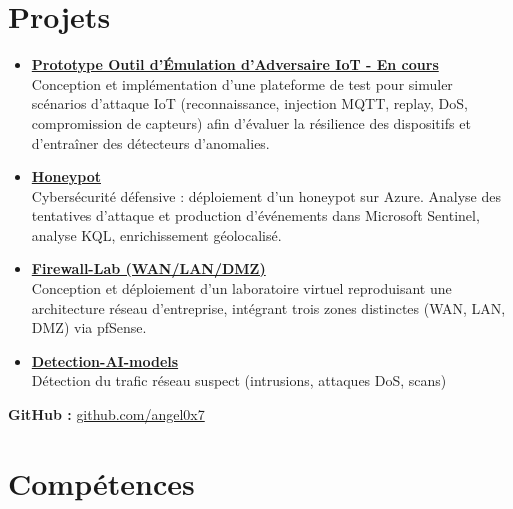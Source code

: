 \documentclass[a4paper,10pt]{article}
\begin{document}
\section*{Projets}


\begin{itemize}[leftmargin=*]


\item \href{https://github.com/angel0x7/IoT-Adversary-Emulator}{\textbf{Prototype Outil d'Émulation d'Adversaire IoT - En cours}} \\
Conception et implémentation d'une plateforme de test pour simuler scénarios d'attaque IoT (reconnaissance, injection MQTT, replay, DoS, compromission de capteurs) afin d'évaluer la résilience des dispositifs et d'entraîner des détecteurs d'anomalies.



  \item \href{https://github.com/angel0x7/Honeypot-}{\textbf{Honeypot}} \\
  Cybersécurité défensive : déploiement d’un honeypot sur Azure. Analyse des tentatives d’attaque et production d’événements dans Microsoft Sentinel, analyse KQL, enrichissement géolocalisé.

  \item \href{https://github.com/angel0x7/Firewall-Lab-WAN-LAN-DMZ-}{\textbf{Firewall-Lab (WAN/LAN/DMZ)}} \\
  Conception et déploiement d’un laboratoire virtuel reproduisant une architecture réseau d’entreprise, intégrant trois zones distinctes (WAN, LAN, DMZ) via pfSense.
  \item \href{https://github.com/angel0x7/Detection-AI-models-}{\textbf{Detection-AI-models}} \\
  Détection du trafic réseau suspect (intrusions, attaques DoS, scans)



\end{itemize}

\noindent
\textbf{GitHub :} \href{https://github.com/angel0x7}{github.com/angel0x7}


\section*{Compétences}
\end{document}
